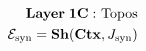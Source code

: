 \documentclass[preview]{standalone}
\begin{document}
\begin{align*}
\special{dvisvgm:raw <g id='unique000'>}\mathbf{Layer\;1C:}\text{ Topos}\\\mathcal{E}_{\text{syn}}=\mathbf{Sh}(\mathbf{Ctx}, J_{\text{syn}})\special{dvisvgm:raw </g>}
\end{align*}
\end{document}
